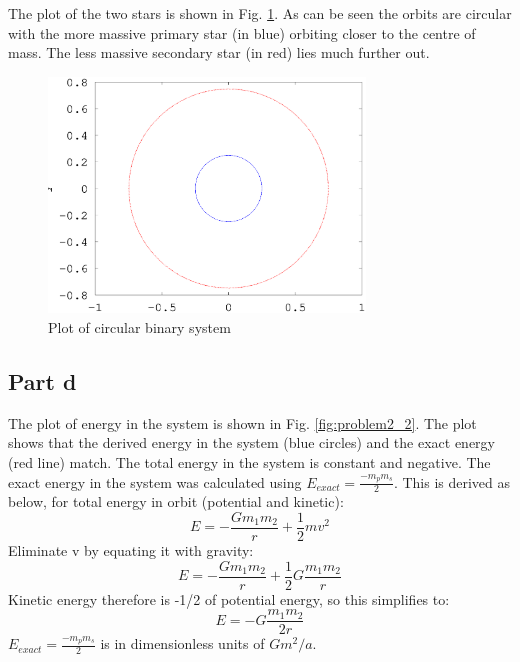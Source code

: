 \documentclass[a4paper,12pt]{article}
\begin{document}
The plot of the two stars is shown in Fig. \ref{fig:problem2_1}. As can be seen the orbits are circular with the more massive primary star (in blue) orbiting closer to the centre of mass. The less massive secondary star (in red) lies much further out. 
\begin{figure}[H]
\centering
\includegraphics[width=0.75\textwidth]{./problem2/problem2_1}
\caption{Plot of circular binary system}
\label{fig:problem2_1}
\end{figure}

\subsection{Part d}
The plot of energy in the system is shown in Fig. \ref{fig:problem2_2}. The plot shows that the derived energy in the system (blue circles) and the exact energy (red line) match. The total energy in the system is constant and negative. The exact energy in the system was calculated using $E_{exact}=\frac{-m_pm_s}{2}$. This is derived as below, for total energy in orbit (potential and kinetic):
\begin{equation}
E=-\frac{Gm_1m_2}{r}+\frac{1}{2}mv^2
\end{equation}
Eliminate v by equating it with gravity:
\begin{equation}
E=-\frac{Gm_1m_2}{r}+\frac{1}{2}G\frac{m_1m_2}{r}
\end{equation}
Kinetic energy therefore is -1/2 of potential energy, so this simplifies to:
\begin{equation}
E=-G\frac{m_1m_2}{2r}
\end{equation}
$E_{exact}=\frac{-m_pm_s}{2}$ is in dimensionless units of $Gm^2/a$.
\end{document}
